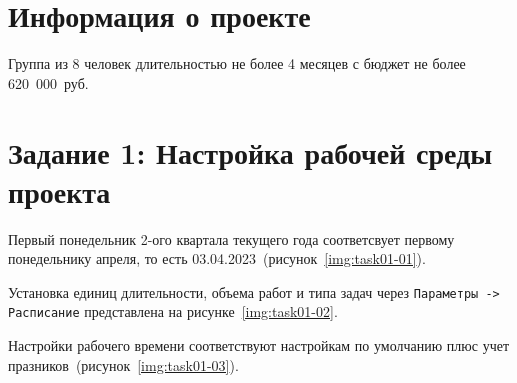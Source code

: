 \section{Информация о проекте}

Группа из 8 человек длительностью не более 4 месяцев с бюджет не более 620~000~руб.

\section{Задание 1: Настройка рабочей среды проекта}

Первый понедельник 2-ого квартала текущего года соответсвует первому
понедельнику апреля, то есть 03.04.2023~(рисунок~\ref{img:task01-01}).


Установка единиц длительности, объема работ и типа задач через
\texttt{Параметры -> Расписание} представлена на рисунке~\ref{img:task01-02}.


Настройки рабочего времени соответствуют настройкам по умолчанию плюс учет
празников~(рисунок~\ref{img:task01-03}).


